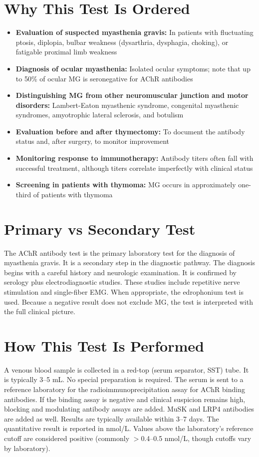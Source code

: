 \section*{Why This Test Is Ordered}
\begin{itemize}
  \item \textbf{Evaluation of suspected myasthenia gravis:} In patients with fluctuating ptosis, diplopia, bulbar weakness (dysarthria, dysphagia, choking), or fatigable proximal limb weakness
  \item \textbf{Diagnosis of ocular myasthenia:} Isolated ocular symptoms; note that up to 50\% of ocular MG is seronegative for AChR antibodies
  \item \textbf{Distinguishing MG from other neuromuscular junction and motor disorders:} Lambert-Eaton myasthenic syndrome, congenital myasthenic syndromes, amyotrophic lateral sclerosis, and botulism
  \item \textbf{Evaluation before and after thymectomy:} To document the antibody status and, after surgery, to monitor improvement
  \item \textbf{Monitoring response to immunotherapy:} Antibody titers often fall with successful treatment, although titers correlate imperfectly with clinical status
  \item \textbf{Screening in patients with thymoma:} MG occurs in approximately one-third of patients with thymoma
\end{itemize}

\section*{Primary vs Secondary Test}
The AChR antibody test is the primary laboratory test for the diagnosis of myasthenia gravis. It is a secondary step in the diagnostic pathway. The diagnosis begins with a careful history and neurologic examination. It is confirmed by serology plus electrodiagnostic studies. These studies include repetitive nerve stimulation and single-fiber EMG. When appropriate, the edrophonium test is used. Because a negative result does not exclude MG, the test is interpreted with the full clinical picture.

\section*{How This Test Is Performed}
A venous blood sample is collected in a red-top (serum separator, SST) tube. It is typically 3--5 mL. No special preparation is required. The serum is sent to a reference laboratory for the radioimmunoprecipitation assay for AChR binding antibodies. If the binding assay is negative and clinical suspicion remains high, blocking and modulating antibody assays are added. MuSK and LRP4 antibodies are added as well. Results are typically available within 3--7 days. The quantitative result is reported in nmol/L. Values above the laboratory's reference cutoff are considered positive (commonly $>$0.4--0.5 nmol/L, though cutoffs vary by laboratory).

